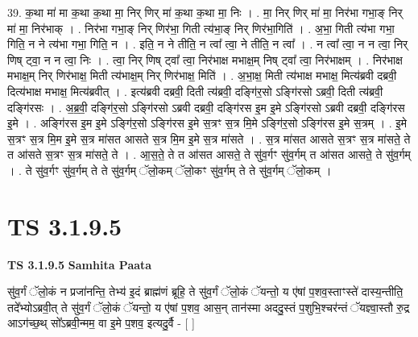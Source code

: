 \documentclass[17pt]{extarticle}
\begin{document}
39. क॒था मा॑ मा क॒था क॒था मा॒ निर् णिर् मा॑ क॒था क॒था मा॒ निः । . मा॒ निर् णिर् मा॑ मा॒ निर॑भा गभा॒ङ् निर् मा॑ मा॒ निर॑भाक् । . निर॑भा गभा॒ङ् निर् णिर॑भा॒ गिती त्य॑भा॒ङ् निर् णिर॑भा॒गिति॑ । . अ॒भा॒ गिती त्य॑भा गभा॒ गिति॒ न ने त्य॑भा गभा॒ गिति॒ न । . इति॒ न ने तीति॒ न त्वा᳚ त्वा॒ ने तीति॒ न त्वा᳚ । . न त्वा᳚ त्वा॒ न न त्वा॒ निर् णिष् ट्वा॒ न न त्वा॒ निः । . त्वा॒ निर् णिष् ट्वा᳚ त्वा॒ निर॑भाक्ष मभाक्ष॒म् निष् ट्वा᳚ त्वा॒ निर॑भाक्षम् । . निर॑भाक्ष मभाक्ष॒म् निर् णिर॑भाक्ष॒ मिती त्य॑भाक्ष॒म् निर् णिर॑भाक्ष॒ मिति॑ । . अ॒भा॒क्ष॒ मिती त्य॑भाक्ष मभाक्ष॒ मित्य॑ब्रवी दब्रवी॒ दित्य॑भाक्ष मभाक्ष॒ मित्य॑ब्रवीत् । . इत्य॑ब्रवी दब्रवी॒ दिती त्य॑ब्रवी॒ दङ्गि॑र॒सो ऽङ्गि॑रसो ऽब्रवी॒ दिती त्य॑ब्रवी॒ दङ्गि॑रसः । . अ॒ब्र॒वी॒ दङ्गि॑र॒सो ऽङ्गि॑रसो ऽब्रवी दब्रवी॒ दङ्गि॑रस इ॒म इ॒मे ऽङ्गि॑रसो ऽब्रवी दब्रवी॒ दङ्गि॑रस इ॒मे । . अङ्गि॑रस इ॒म इ॒मे ऽङ्गि॑र॒सो ऽङ्गि॑रस इ॒मे स॒त्रꣳ स॒त्र मि॒मे ऽङ्गि॑र॒सो ऽङ्गि॑रस इ॒मे स॒त्रम् । . इ॒मे स॒त्रꣳ स॒त्र मि॒म इ॒मे स॒त्र मा॑सत आसते स॒त्र मि॒म इ॒मे स॒त्र मा॑सते । . स॒त्र मा॑सत आसते स॒त्रꣳ स॒त्र मा॑सते॒ ते त आ॑सते स॒त्रꣳ स॒त्र मा॑सते॒ ते । . आ॒स॒ते॒ ते त आ॑सत आसते॒ ते सु॑व॒र्गꣳ सु॑व॒र्गम् त आ॑सत आसते॒ ते सु॑व॒र्गम् । . ते सु॑व॒र्गꣳ सु॑व॒र्गम् ते ते सु॑व॒र्गम् ॅलो॒कम् ॅलो॒कꣳ सु॑व॒र्गम् ते ते सु॑व॒र्गम् ॅलो॒कम् । \newline
\pagebreak
{}

\section{ TS 3.1.9.5 }

\textbf{TS 3.1.9.5 } \newline
\textbf{Samhita Paata} \newline

सु॑व॒र्गं ॅलो॒कं न प्रजा॑नन्ति॒ तेभ्य॑ इ॒दं ब्राह्म॑णं ब्रूहि॒ ते सु॑व॒र्गं ॅलो॒कं ॅयन्तो॒ य ए॑षां प॒शव॒स्ताꣳस्ते॑ दास्य॒न्तीति॒ तदे᳚भ्योऽब्रवी॒त् ते सु॑व॒र्गं ॅलो॒कं ॅयन्तो॒ य ए॑षां प॒शव॒ आस॒न् तान॑स्मा अददु॒स्तं प॒शुभि॒श्चर॑न्तं ॅयज्ञ्वा॒स्तौ रु॒द्र आऽग॑च्छ॒थ् सो᳚ऽब्रवी॒न्मम॒ वा इ॒मे प॒शव॒ इत्यदु॒र्वै - [  ] \newline
\end{document}
